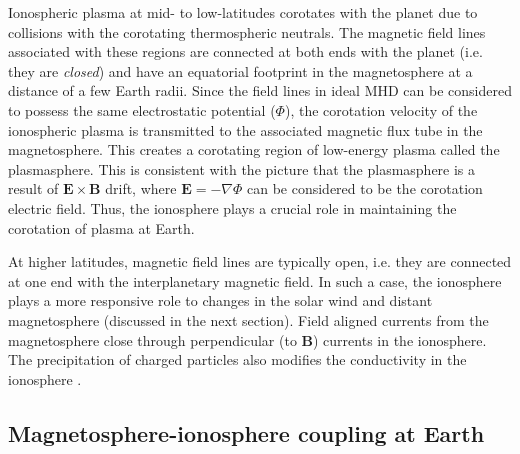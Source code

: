 Ionospheric plasma at mid- to low-latitudes corotates with the planet due to collisions with the corotating thermospheric neutrals. The magnetic field lines associated with these regions are connected at both ends with the planet (i.e. they are \emph{closed}) and have an equatorial footprint in the magnetosphere at a distance of a few Earth radii. Since the field lines in ideal MHD can be considered to possess the same electrostatic potential ($\Phi$), the corotation velocity of the ionospheric plasma is transmitted to the associated magnetic flux tube in the magnetosphere. This creates a corotating region of low-energy plasma called the plasmasphere. This is consistent with the picture that the plasmasphere is a result of $\mathbf{E}\times\mathbf{B}$ drift, where $\mathbf{E}=-\nabla \Phi$ can be considered to be the corotation electric field. Thus, the ionosphere plays a crucial role in maintaining the corotation of plasma at Earth. 

At higher latitudes, magnetic field lines are typically open, i.e. they are connected at one end with the interplanetary magnetic field. In such a case, the ionosphere plays a more responsive role to changes in the solar wind and distant magnetosphere (discussed in the next section). Field aligned currents from the magnetosphere close through perpendicular (to $\mathbf{B}$) currents in the ionosphere. The precipitation of charged particles also modifies the conductivity in the ionosphere \cite{Schunk2009Ionospheres}. 

\subsection{Magnetosphere-ionosphere coupling at Earth}

